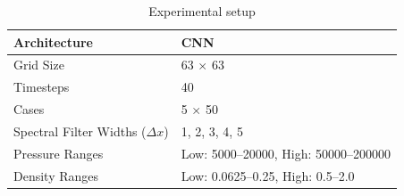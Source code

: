 \documentclass{article}
\begin{document}
\begin{table}[h]
    \centering
    \begin{tabular}{l l}
        \hline
        Architecture     & CNN \\
        \hline
        Grid Size        & 63 $\times$ 63 \\
        \hline
        Timesteps        & 40 \\
        \hline
        Cases            & 5 $\times$ 50 \\
        \hline
        Spectral Filter Widths ($\Delta x$) & 1, 2, 3, 4, 5 \\
        \hline
        Pressure Ranges  & Low: 5000--20000, High: 50000--200000 \\
        \hline
        Density Ranges   & Low: 0.0625--0.25, High: 0.5--2.0 \\
        \hline
    \end{tabular}
    \caption{Experimental setup}
    \label{tab:setup}
\end{table}
\end{document}
